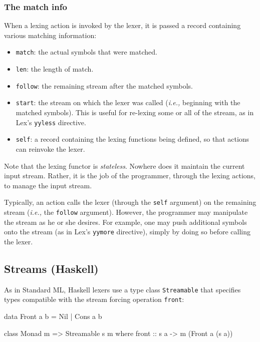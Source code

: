 \documentclass[10pt]{article}
\begin{document}
\begin{strictcode}
\subsubsection{The match info}
\label{sec:match-info}

When a lexing action is invoked by the lexer, it is passed a record
containing various matching information:

\begin{itemize}
\item
{\tt match}:
the actual symbols that were matched.

\item
{\tt len}:
the length of match.

\item
{\tt follow}:
the remaining stream after the matched symbols.

\item
{\tt start}:
the stream on which the lexer was called ({\em i.e.,} beginning with the
matched symbols).  This is useful for re-lexing some or all of the
stream, as in Lex's {\tt yyless} directive.

\item
{\tt self}:
a record containing the lexing functions being defined, so that
actions can reinvoke the lexer.
\end{itemize}

Note that the lexing functor is {\em stateless}.  Nowhere does it maintain
the current input stream.  Rather, it is the job of the programmer,
through the lexing actions, to manage the input stream.

Typically, an action calls the lexer (through the {\tt self} argument) on
the remaining stream ({\em i.e.,} the {\tt follow} argument).  However, the
programmer may manipulate the stream as he or she desires.  For
example, one may push additional symbols onto the stream (as in Lex's
{\tt yymore} directive), simply by doing so before calling the lexer.


\subsection{Streams (Haskell)}

As in Standard ML, Haskell lexers use a type class {\tt Streamable} that
specifies types compatible with the stream forcing operation {\tt front}:

\begin{code}
data Front a b =
   Nil 
 | Cons a b

class Monad m => Streamable s m where
   front :: s a -> m (Front a (s a))
\end{code}



\end{strictcode}
\end{document}
